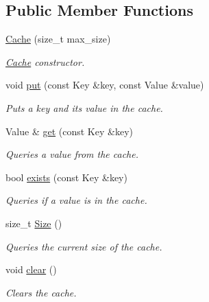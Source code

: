 \subsection*{Public Member Functions}
\begin{DoxyCompactItemize}
\item 
\hyperlink{classCache_aff01185fbb5b12ac5e139444e092b471}{Cache} (size\+\_\+t max\+\_\+size)
\begin{DoxyCompactList}\small\item\em \hyperlink{classCache}{Cache} constructor. \end{DoxyCompactList}\item 
void \hyperlink{classCache_a7b54629fb513d4b1652951bb713a0635}{put} (const Key \&key, const Value \&value)
\begin{DoxyCompactList}\small\item\em Puts a key and its value in the cache. \end{DoxyCompactList}\item 
Value \& \hyperlink{classCache_ae2c5a764bec9cf7bcc455d37377ff477}{get} (const Key \&key)
\begin{DoxyCompactList}\small\item\em Queries a value from the cache. \end{DoxyCompactList}\item 
bool \hyperlink{classCache_a3cbee30a98148ba6e15e28e4e096d995}{exists} (const Key \&key)
\begin{DoxyCompactList}\small\item\em Queries if a value is in the cache. \end{DoxyCompactList}\item 
\mbox{\label{classCache_a6b13a48d9bc1217c9408e66543655e67}} 
size\+\_\+t \hyperlink{classCache_a6b13a48d9bc1217c9408e66543655e67}{Size} ()
\begin{DoxyCompactList}\small\item\em Queries the current size of the cache. \end{DoxyCompactList}\item 
\mbox{\label{classCache_addfc9aa7e42dcac6ab1ba103a75cdc66}} 
void \hyperlink{classCache_addfc9aa7e42dcac6ab1ba103a75cdc66}{clear} ()
\begin{DoxyCompactList}\small\item\em Clears the cache. \end{DoxyCompactList}\end{DoxyCompactItemize}
